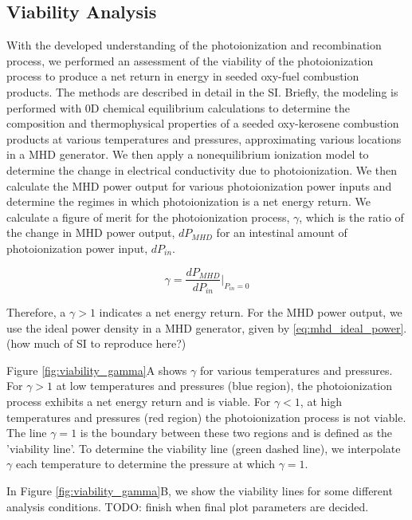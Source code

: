 \subsection{Viability Analysis}

With the developed understanding of the photoionization and recombination process, we performed an assessment of the viability of the photoionization process to produce a net return in energy in seeded oxy-fuel combustion products. The methods are described in detail in the SI. Briefly, the modeling is performed with 0D chemical equilibrium calculations to determine the composition and thermophysical properties of a seeded oxy-kerosene combustion products at various temperatures and pressures, approximating various locations in a MHD generator. We then apply a nonequilibrium ionization model to determine the change in electrical conductivity due to photoionization. We then calculate the MHD power output for various photoionization power inputs and determine the regimes in which photoionization is a net energy return. We calculate a figure of merit for the photoionization process, $\gamma$, which is the ratio of the change in MHD power output, $dP_{MHD}$ for an intestinal amount of photoionization power input, $dP_{in}$. 


\begin{equation}
\gamma = \frac{dP_{MHD}}{dP_{in}} \Big|_{P_{in}=0}
\end{equation}

Therefore, a $\gamma > 1$ indicates a net energy return. For the MHD power output, we use the ideal power density in a MHD generator, given by \ref{eq:mhd_ideal_power}. (how much of SI to reproduce here?)

Figure \ref{fig:viability_gamma}A shows $\gamma$ for various temperatures and pressures.  For $\gamma > 1$ at low temperatures and pressures (blue region), the photoionization process exhibits a net energy return and is viable. For $\gamma < 1$, at high temperatures and pressures (red region) the photoionization process is not viable. The line $\gamma = 1$ is the boundary between these two regions and is defined as the 'viability line'. To determine the viability line (green dashed  line), we interpolate $\gamma$ each temperature to determine the pressure at which $\gamma = 1$. 

In Figure \ref{fig:viability_gamma}B, we show the viability lines for some different analysis conditions. TODO: finish when final plot parameters are decided. 

